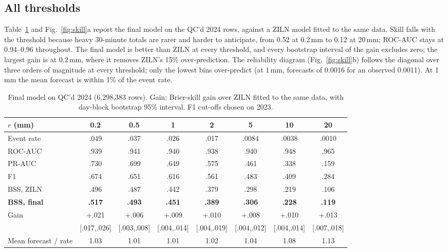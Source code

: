 \documentclass[lang=en,11pt,a4paper,bibend=bibtex]{elegantpaper}
\newcommand{\mm}{\,mm}
\begin{document}
\subsection{All thresholds}
Table~\ref{tab:final} and Fig.~\ref{fig:skill}a report the final model on the QC'd 2024 rows, against a ZILN model fitted to the same data. Skill falls with the threshold because heavy 30-minute totals are rarer and harder to anticipate, from 0.52 at 0.2\mm{} to 0.12 at 20\mm; ROC-AUC stays at 0.94--0.96 throughout. The final model is better than ZILN at every threshold, and every bootstrap interval of the gain excludes zero; the largest gain is at 0.2\mm, where it removes ZILN's 15\% over-prediction. The reliability diagram (Fig.~\ref{fig:skill}b) follows the diagonal over three orders of magnitude at every threshold; only the lowest bins over-predict (at 1\mm, forecasts of 0.0016 for an observed 0.0011). At 1\mm{} the mean forecast is within 1\% of the event rate.

\begin{table}[H]
\centering\small
\caption{Final model on QC'd 2024 (6,298,383 rows). Gain: Brier-skill gain over ZILN fitted to the same data, with day-block bootstrap 95\% interval. F1 cut-offs chosen on 2023.}\label{tab:final}
\renewcommand{\arraystretch}{1.15}
\begin{tabular*}{\linewidth}{@{\extracolsep{\fill}}lccccccc@{}}
\toprule
$r$ (mm) & 0.2 & 0.5 & 1 & 2 & 5 & 10 & 20 \\
\midrule
Event rate & .049 & .037 & .026 & .017 & .0084 & .0038 & .0010 \\
ROC-AUC & .939 & .941 & .940 & .938 & .940 & .948 & .965 \\
PR-AUC & .730 & .699 & .649 & .575 & .461 & .338 & .159 \\
F1 & .674 & .651 & .616 & .561 & .483 & .409 & .284 \\
BSS, ZILN & .496 & .487 & .442 & .379 & .298 & .219 & .106 \\
\textbf{BSS, final} & \textbf{.517} & \textbf{.493} & \textbf{.451} & \textbf{.389} & \textbf{.306} & \textbf{.228} & \textbf{.119} \\
\multirow{2}{*}{Gain} & +.021 & +.006 & +.009 & +.010 & +.008 & +.010 & +.013 \\
& {\scriptsize[.017,.026]} & {\scriptsize[.003,.008]} & {\scriptsize[.004,.014]} & {\scriptsize[.004,.019]} & {\scriptsize[.004,.012]} & {\scriptsize[.004,.014]} & {\scriptsize[.007,.018]} \\
Mean forecast / rate & 1.03 & 1.01 & 1.01 & 1.02 & 1.04 & 1.08 & 1.13 \\
\bottomrule
\end{tabular*}
\end{table}
\end{document}
